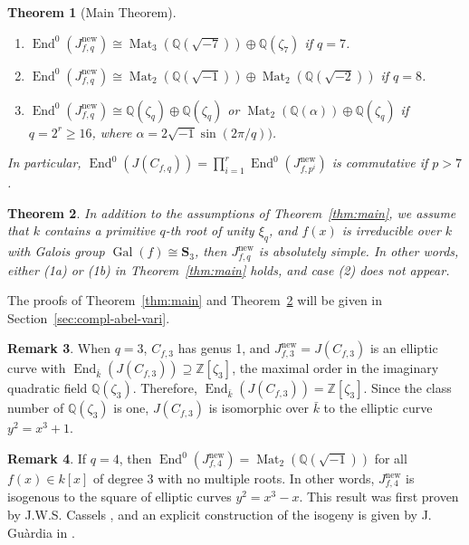 \documentclass{amsart}[11pt]
\newtheorem{thm}{Theorem}[section]
\theoremstyle{definition}
\newtheorem{rem}[thm]{Remark}
\numberwithin{equation}{section}
\theoremstyle{notitle}
\begin{document}
\begin{thm}[Main Theorem]
\begin{enumerate}
\begin{enumerate}
      $q=4, 5$ or
      $9$. 
     \item[(2d)] $\operatorname{End}^0(J_{f,q}^{\mathrm{new}})\cong \operatorname{Mat}_3({\mathbb{Q}}(\sqrt{-7}))\oplus
       {\mathbb{Q}}(\zeta_7)$ if $q=7$. 
     \item[(2e)] $\operatorname{End}^0(J_{f,q}^{\mathrm{new}}) \cong \operatorname{Mat}_2({\mathbb{Q}}(\sqrt{-1}))\oplus
       \operatorname{Mat}_2({\mathbb{Q}}(\sqrt{-2}))$ if $q=8$. 
     \item[(2f)] $\operatorname{End}^0(J_{f,q}^{\mathrm{new}}) \cong {\mathbb{Q}}(\zeta_q)\oplus
       {\mathbb{Q}}(\zeta_q)$ or $\operatorname{Mat}_2({\mathbb{Q}}(\alpha))\oplus
       {\mathbb{Q}}(\zeta_q)$ if $q=2^r\geq 16$, where $\alpha=
       2\sqrt{-1}\sin(2\pi/q))$.
        \end{enumerate}
  \end{enumerate}
In particular,  $\operatorname{End}^0(J(C_{f,q}))=
\prod_{i=1}^r \operatorname{End}^0(J_{f,p^i}^{\mathrm{new}})$ is commutative if $p>7$. 
\end{thm}

\begin{thm}\label{thm:galois-group-is-s3}
  In addition to the assumptions of Theorem~\ref{thm:main}, we assume
  that $k$ contains a primitive $q$-th root of unity $\xi_q$, and
  $f(x)$ is irreducible over $k$ with Galois group $\operatorname{Gal}(f)\cong
  \mathbf{S}_3$, then $J_{f,q}^{\mathrm{new}}$ is absolutely simple. In other
  words, either (1a) or (1b) in Theorem~\ref{thm:main} holds, and
  case (2) does not appear.
\end{thm}
The proofs of Theorem~\ref{thm:main} and
Theorem~\ref{thm:galois-group-is-s3} will be given in
Section~\ref{sec:compl-abel-vari}. 
\begin{rem}
  When $q=3$, $C_{f,3}$ has genus 1, and $J_{f,3}^{\mathrm{new}}=J(C_{f,3})$ is
  an elliptic curve with $\operatorname{End}_{\bar{k}}(J(C_{f,3}))\supseteq {\mathbb{Z}}[\zeta_3]$, the
  maximal order in the imaginary quadratic field
  ${\mathbb{Q}}(\zeta_3)$. Therefore, $\operatorname{End}_{\bar{k}}(J(C_{f,3}))={\mathbb{Z}}[\zeta_3]$. Since
  the class number of ${\mathbb{Q}}(\zeta_3)$ is one, $J(C_{f,3})$ is
  isomorphic over $\bar{k}$ to the elliptic curve $y^2=
  x^3+1$. 
\end{rem}
\begin{rem}
  If $q=4$, then
  $\operatorname{End}^0(J_{f,4}^{\mathrm{new}})=\operatorname{Mat}_2({\mathbb{Q}}(\sqrt{-1}))$ for all $f(x)\in k[x]$ of
  degree 3 with no multiple roots. In other words, $J_{f,4}^{\mathrm{new}}$ is
  isogenous to the square of elliptic curves $y^2=x^3-x$. This result
  was first proven by J.W.S. Cassels \cite{MR807702}, and an explicit
  construction of the isogeny is given by J. Gu{\`a}rdia in \cite{MR1853452}. 
\end{rem}
\end{document}
